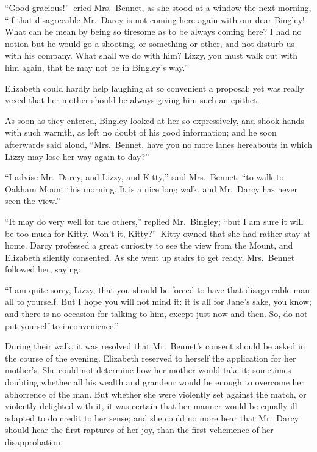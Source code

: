 \documentclass[12pt,english]{book}
\begin{document}
\bigskip{} {}``Good gracious!''\ cried Mrs.\ Bennet, as she stood
at a window the next morning, {}``if that disagreeable Mr.\ Darcy
is not coming here again with our dear Bingley! What can he mean by
being so tiresome as to be always coming here? I had no notion but
he would go a-shooting, or something or other, and not disturb us
with his company. What shall we do with him? Lizzy, you must walk
out with him again, that he may not be in Bingley's way.''

Elizabeth could hardly help laughing at so convenient a proposal;
yet was really vexed that her mother should be always giving him such
an epithet.

As soon as they entered, Bingley looked at her so expressively, and
shook hands with such warmth, as left no doubt of his good information;
and he soon afterwards said aloud, {}``Mrs.\ Bennet, have you no
more lanes hereabouts in which Lizzy may lose her way again to-day?''\


{}``I advise Mr.\ Darcy, and Lizzy, and Kitty,'' said Mrs.\ Bennet,
{}``to walk to Oakham Mount this morning. It is a nice long walk,
and Mr.\ Darcy has never seen the view.''

{}``It may do very well for the others,'' replied Mr.\ Bingley;
{}``but I am sure it will be too much for Kitty. Won't it, Kitty?''\
Kitty owned that she had rather stay at home. Darcy professed a great
curiosity to see the view from the Mount, and Elizabeth silently consented.
As she went up stairs to get ready, Mrs.\ Bennet followed her, saying:

{}``I am quite sorry, Lizzy, that you should be forced to have that
disagreeable man all to yourself. But I hope you will not mind it:
it is all for Jane's sake, you know; and there is no occasion for
talking to him, except just now and then. So, do not put yourself
to inconvenience.''

During their walk, it was resolved that Mr.\ Bennet's consent should
be asked in the course of the evening. Elizabeth reserved to herself
the application for her mother's. She could not determine how her
mother would take it; sometimes doubting whether all his wealth and
grandeur would be enough to overcome her abhorrence of the man. But
whether she were violently set against the match, or violently delighted
with it, it was certain that her manner would be equally ill adapted
to do credit to her sense; and she could no more bear that Mr.\ Darcy
should hear the first raptures of her joy, than the first vehemence
of her disapprobation.
\end{document}
